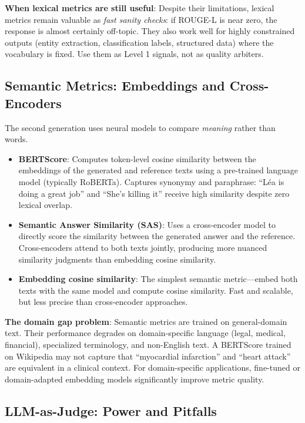 \textbf{When lexical metrics are still useful}: Despite their limitations, lexical metrics remain valuable as \emph{fast sanity checks}: if ROUGE-L is near zero, the response is almost certainly off-topic. They also work well for highly constrained outputs (entity extraction, classification labels, structured data) where the vocabulary is fixed. Use them as Level 1 signals, not as quality arbiters.

\subsection{Semantic Metrics: Embeddings and Cross-Encoders}

The second generation uses neural models to compare \emph{meaning} rather than words.

\begin{itemize}[leftmargin=*]
    \item \textbf{BERTScore}: Computes token-level cosine similarity between the embeddings of the generated and reference texts using a pre-trained language model (typically RoBERTa). Captures synonymy and paraphrase: ``Léa is doing a great job'' and ``She's killing it'' receive high similarity despite zero lexical overlap.
    \item \textbf{Semantic Answer Similarity (SAS)}: Uses a cross-encoder model to directly score the similarity between the generated answer and the reference. Cross-encoders attend to both texts jointly, producing more nuanced similarity judgments than embedding cosine similarity.
    \item \textbf{Embedding cosine similarity}: The simplest semantic metric---embed both texts with the same model and compute cosine similarity. Fast and scalable, but less precise than cross-encoder approaches.
\end{itemize}

\textbf{The domain gap problem}: Semantic metrics are trained on general-domain text. Their performance degrades on domain-specific language (legal, medical, financial), specialized terminology, and non-English text. A BERTScore trained on Wikipedia may not capture that ``myocardial infarction'' and ``heart attack'' are equivalent in a clinical context. For domain-specific applications, fine-tuned or domain-adapted embedding models significantly improve metric quality.

\subsection{LLM-as-Judge: Power and Pitfalls}

